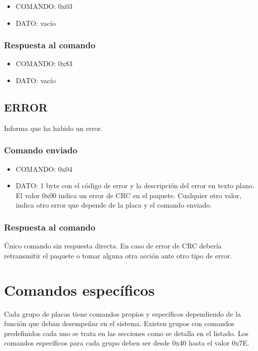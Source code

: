 \documentclass[a4paper,10pt]{article}
\begin{document}
\begin{itemize}
	\item{COMANDO:} 0x03
	\item{DATO:} vac\'io
\end{itemize}

\subsubsection*{Respuesta al comando}
\label{ping_respuesta}

\begin{itemize}
	\item{COMANDO:} 0x83
	\item{DATO:} vac\'io
\end{itemize}

\subsection{ERROR}
\label{error}

Informa que ha habido un error.

\subsubsection*{Comando enviado}
\label{error_comando_enviado}

\begin{itemize}
	\item{COMANDO:} 0x04
	\item{DATO:} 1 byte con el c\'odigo de error y la descripci\'on del error en texto plano.
	El valor 0x00 indica un error de CRC en el paquete.
	Cualquier otro valor, indica otro error que depende de la placa y el comando enviado.
\end{itemize}

\subsubsection*{Respuesta al comando}
\label{error_respuesta}

\'Unico comando sin respuesta directa.
En caso de error de CRC deber\'ia retransmitir el paquete o tomar alguna otra acci\'on ante otro tipo de error.

\section{Comandos espec\'ificos}
\label{comandos_especificos}

Cada grupo de placas tiene comandos propios y espec\'ificos dependiendo de la funci\'on que deban desempe\~nar en el sistema.
Existen grupos con comandos predefinidos cada uno se trata en las secciones como se detalla en el listado.
Los comandos espec\'ificos para cada grupo deben ser desde 0x40 hasta el valor 0x7E.
\end{document}
